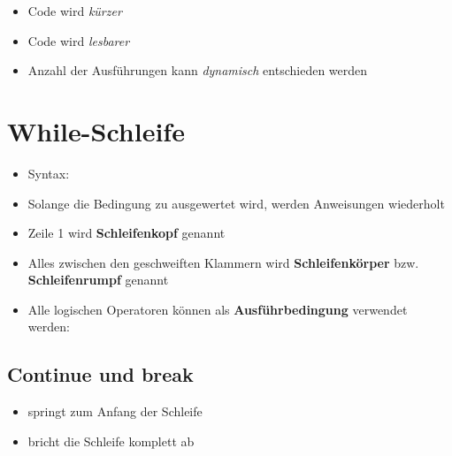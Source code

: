 \begin{frame}
    \slidehead

    \begin{itemize}
        \item Code wird \textit{kürzer}
        \item Code wird \textit{lesbarer}
        \item Anzahl der Ausführungen kann \textit{dynamisch} entschieden werden
    \end{itemize}
\end{frame}


\section{While-Schleife}
\subtitle{Kapitel 4: Befehle wiederholen}

\begin{frame}
    \slidehead

    \begin{itemize}
        \item Syntax:
        \item Solange die Bedingung zu  ausgewertet wird, werden Anweisungen wiederholt
        \item Zeile 1 wird \textbf{Schleifenkopf} genannt
        \item Alles zwischen den geschweiften Klammern wird \textbf{Schleifenkörper} bzw. \textbf{Schleifenrumpf} genannt
    \end{itemize}
\end{frame}

\begin{frame}
    \slidehead
    \begin{itemize}
        \item Alle logischen Operatoren können als \textbf{Ausführbedingung} verwendet werden:
    \end{itemize}
\end{frame}

\livecoding

\subsection{Continue und break}
\begin{frame}
    \slidehead

    \begin{itemize}
        \item {} springt zum Anfang der Schleife
        \item {} bricht die Schleife komplett ab
    \end{itemize}
\end{frame}

